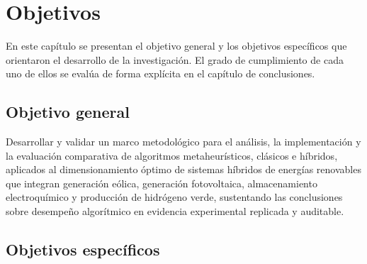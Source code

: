 \chapter{Objetivos}

En este capítulo se presentan el objetivo general y los objetivos específicos que orientaron el desarrollo de la investigación. El grado de cumplimiento de cada uno de ellos se evalúa de forma explícita en el capítulo de conclusiones.

\section{Objetivo general}

Desarrollar y validar un marco metodológico para el análisis, la implementación y la evaluación comparativa de algoritmos metaheurísticos, clásicos e híbridos, aplicados al dimensionamiento óptimo de sistemas híbridos de energías renovables que integran generación eólica, generación fotovoltaica, almacenamiento electroquímico y producción de hidrógeno verde, sustentando las conclusiones sobre desempeño algorítmico en evidencia experimental replicada y auditable.

\section{Objetivos específicos}

